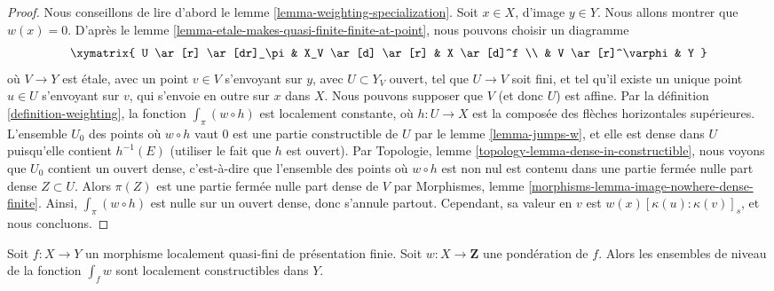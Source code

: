 \begin{proof}
Nous conseillons de lire d'abord le lemme \ref{lemma-weighting-specialization}.
Soit $x \in X$, d'image $y \in Y$. Nous allons montrer que $w(x) = 0$. D'après le
lemme \ref{lemma-etale-makes-quasi-finite-finite-at-point},
nous pouvons choisir un diagramme
$$
\xymatrix{
U \ar[r] \ar[dr]_\pi & X_V \ar[d] \ar[r] & X \ar[d]^f \\
& V \ar[r]^\varphi & Y
}
$$
où $V \to Y$ est \'etale, avec un point $v \in V$ s'envoyant sur $y$,
avec $U \subset Y_V$ ouvert, tel que $U \to V$ soit fini, et
tel qu'il existe un unique point $u \in U$ s'envoyant sur $v$,
qui s'envoie en outre sur $x$ dans $X$. Nous pouvons supposer que $V$
(et donc $U$) est affine. Par la définition \ref{definition-weighting},
la fonction $\int_\pi (w \circ h)$ est localement constante, où
$h : U \to X$ est la composée des flèches horizontales supérieures.
L'ensemble $U_0$ des points où $w \circ h$ vaut $0$ est une
partie constructible de $U$ par le lemme \ref{lemma-jumps-w},
et elle est dense dans $U$ puisqu'elle contient $h^{-1}(E)$ (utiliser le fait que $h$ est ouvert).
Par Topologie, lemme \ref{topology-lemma-dense-in-constructible},
nous voyons que $U_0$ contient un ouvert dense,
c'est-à-dire que l'ensemble des points où $w \circ h$ est non nul est contenu
dans une partie fermée nulle part dense $Z \subset U$. Alors $\pi(Z)$
est une partie fermée nulle part dense de $V$ par
Morphismes, lemme \ref{morphisms-lemma-image-nowhere-dense-finite}.
Ainsi, $\int_\pi (w \circ h)$ est nulle sur un ouvert dense, donc
s'annule partout.
Cependant, sa valeur en $v$ est $w(x)[\kappa(u):\kappa(v)]_s$,
et nous concluons.
\end{proof}

\begin{lemma}
\label{lemma-jumps-int-w}
Soit $f : X \to Y$ un morphisme localement quasi-fini de présentation
finie. Soit $w : X \to \mathbf{Z}$ une pondération de $f$. Alors
les ensembles de niveau de la fonction $\int_f w$ sont localement constructibles dans $Y$.
\end{lemma}

